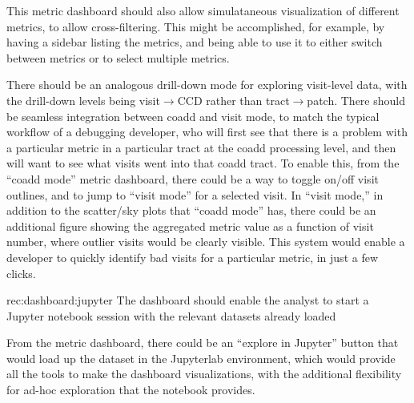 This metric dashboard should also allow simulataneous visualization of different metrics, to allow cross-filtering.
This might be accomplished, for example, by having a sidebar listing the metrics, and being able to use it to either switch between metrics or to select multiple metrics.

There should be an analogous drill-down mode for exploring visit-level data, with the drill-down levels being visit$\rightarrow$CCD rather than tract$\rightarrow$patch.
There should be seamless integration between coadd and visit mode, to match the typical workflow of a debugging developer, who will first see that there is a problem with a particular metric in a particular tract at the coadd processing level, and then will want to see what visits went into that coadd tract.
To enable this, from the ``coadd mode'' metric dashboard, there could be a way to toggle on/off visit outlines, and to jump to ``visit mode'' for a selected visit.
In ``visit mode,'' in addition to the scatter/sky plots that ``coadd mode'' has, there could be an additional figure showing the aggregated metric value as a function of visit number, where outlier visits would be clearly visible.
This system would enable a developer to quickly identify bad visits for a particular metric, in just a few clicks.

\begin{recommendation}
    {rec:dashboard:jupyter}
    {The dashboard should enable the analyst to start a Jupyter notebook session with the relevant datasets already loaded}
\end{recommendation}

From the metric dashboard, there could be an ``explore in Jupyter'' button that would load up the dataset in the Jupyterlab environment, which would provide all the tools to make the dashboard visualizations, with the additional flexibility for ad-hoc exploration that the notebook provides.
